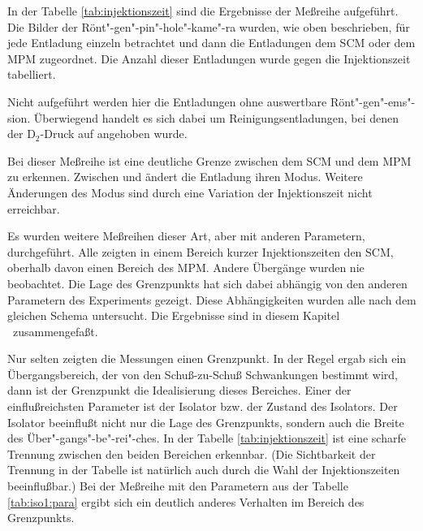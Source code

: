 %
\par
In der Tabelle \vref{tab:injektionszeit} sind die Ergebnisse der
Meßreihe aufgeführt. Die Bilder der Rönt"-gen"-pin"-hole"-kame"-ra
wurden, wie oben beschrieben, für jede Entladung einzeln
betrachtet und dann die Entladungen dem SCM oder dem MPM
zugeordnet. Die Anzahl dieser Entladungen wurde gegen die
Injektionszeit tabelliert.
\par
Nicht aufgeführt werden hier die Entladungen ohne auswertbare
Rönt"-gen"-ems"-sion. Überwiegend handelt es sich dabei um
Reinigungsentladungen, bei denen der D$_2$-Druck auf
 angehoben wurde.
\par
Bei dieser Meßreihe ist eine deutliche Grenze zwischen dem SCM und dem
MPM zu erkennen. Zwischen  und  ändert die
Entladung ihren Modus. Weitere Änderungen des Modus sind durch eine
Variation der Injektionszeit nicht erreichbar.
\par
Es wurden weitere Meßreihen dieser Art, aber mit anderen
Parametern, durchgeführt. Alle zeigten in einem Bereich kurzer
Injektionszeiten den SCM, oberhalb davon einen Bereich des MPM.
Andere Übergänge wurden nie beobachtet. Die Lage des Grenzpunkts
hat sich dabei abhängig von den anderen Parametern des Experiments
gezeigt. Diese Abhängigkeiten wurden alle nach dem gleichen Schema
untersucht. Die Ergebnisse sind in diesem Kapitel \thesection\
zusammengefaßt.
\par
Nur selten zeigten die Messungen einen Grenzpunkt. In der Regel ergab
sich ein Übergangsbereich, der von den Schuß-zu-Schuß Schwankungen
bestimmt wird, dann ist der Grenzpunkt die Idealisierung dieses
Bereiches.
%
\label{iso:problem}
%
Einer der einflußreichsten Parameter ist der Isolator bzw. der
Zustand des Isolators. Der Isolator beeinflußt nicht nur die Lage
des Grenzpunkts, sondern auch die Breite des
Über"-gangs"-be"-rei"-ches. In der Tabelle
\vref{tab:injektionszeit} ist eine scharfe Trennung zwischen den
beiden Bereichen erkennbar. (Die Sichtbarkeit der Trennung in der
Tabelle ist natürlich auch durch die Wahl der Injektionszeiten
beeinflußbar.) Bei der Meßreihe mit den Parametern aus der Tabelle
\vref{tab:iso1:para} ergibt sich ein deutlich anderes Verhalten im
Bereich des Grenzpunkts.
%
\par
